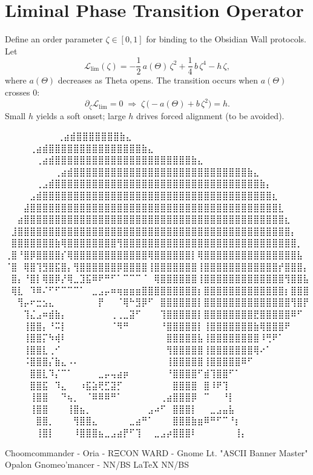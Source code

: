 
\section*{Liminal Phase Transition Operator}

Define an order parameter $\zeta\in[0,1]$ for binding to the Obsidian Wall protocols.  
Let
\[
\mathcal{L}_{\text{lim}}(\zeta)= -\frac{1}{2}\,a(\Theta)\,\zeta^2+\frac{1}{4}\,b\,\zeta^4-h\,\zeta,
\]
where $a(\Theta)$ decreases as Theta opens.  
The transition occurs when $a(\Theta)$ crosses $0$:
\[
\partial_\zeta \mathcal{L}_{\text{lim}}=0\;\Rightarrow\; \zeta\,\bigl(-a(\Theta)+b\,\zeta^2\bigr)=h.
\]
Small $h$ yields a soft onset; large $h$ drives forced alignment (to be avoided).

\iffalse
⠀⠀⠀⠀⠀⠀             ⠀⠀⢀⣴⣾⣿⣿⣿⣿⣿⣿⣿⣷⣄⠀⠀⠀⠀⠀⠀⠀⠀
⠀⠀⠀  ⠀      ⠀⠀⠀⠀⢀⣴⣾⣿⣿⣿⣿⣿⣿⣿⣿⣿⣿⣿⣿⣿⣿⣿⣷⣄⠀⠀⠀⠀⠀⠀⠀⠀
⠀⠀ ⠀   ⠀⠀⠀⠀⠀⢀⣴⣾⣿⣿⣿⣿⣿⣿⣿⣿⣿⣿⣿⣿⣿⣿⣿⣿⣿⣿⣿⣿⣿⣿⣷⣄⠀⠀⠀⠀⠀⠀⠀⠀
⠀⠀⠀⠀⠀⠀⠀⠀⢀⣴⣾⣿⣿⣿⣿⣿⣿⣿⣿⣿⣿⣿⣿⣿⣿⣿⣿⣿⣿⣿⣿⣿⣿⣿⣿⣿⣿⣿⣿⣷⣄⠀⠀⠀⠀⠀⠀⠀⠀
⠀⠀⠀⠀⠀⢀⣠⣾⣿⣿⣿⣿⣿⣿⣿⣿⣿⣿⣿⣿⣿⣿⣿⣿⣿⣿⣿⣿⣿⣿⣿⣿⣿⣿⣿⣿⣿⣿⣿⣿⣿⣷⡄⠀⠀⠀⠀⠀⠀
⠀⠀⠀⠀⣠⣾⣿⣿⣿⣿⣿⣿⣿⣿⣿⣿⣿⣿⣿⣿⣿⣿⣿⣿⣿⣿⣿⣿⣿⣿⣿⣿⣿⣿⣿⣿⣿⣿⣿⣿⣿⣿⣿⣆⠀⠀⠀⠀⠀
⠀⠀⠀⣼⣿⣿⣿⣿⣿⣿⣿⣿⣿⣿⣿⣿⣿⣿⣿⣿⣿⣿⣿⣿⣿⣿⣿⣿⣿⣿⣿⣿⣿⣿⣿⣿⣿⣿⣿⣿⣿⣿⣿⣿⣇⠀⠀⠀⠀
⠀⠀⣴⣿⣿⣿⣿⣿⣿⣿⣿⣿⣿⣿⣿⣿⣿⣿⣿⣿⣿⣿⣿⣿⣿⣿⣿⣿⣿⣿⣿⣿⣿⣿⣿⣿⣿⣿⣿⣿⣿⣿⣿⣿⣿⣆⠀⠀⠀
⠀⣸⣿⣿⣿⣿⣿⣿⣿⣿⣿⣿⣿⣿⣿⣿⣿⣿⣿⣿⣿⣿⣿⣿⣿⣿⣿⣿⣿⣿⣿⣿⣿⣿⣿⣿⣿⣿⣿⣿⣿⣿⣿⣿⣿⣿⡄⠀⠀
⠀⣿⣿⣿⣿⣿⣿⣿⣷⢿⣿⣿⣿⣿⣿⣿⣿⣿⢻⣿⣿⣿⣿⣿⣿⣿⣿⣿⣿⣿⣿⣿⣿⣿⣿⣿⣿⣿⣿⣿⣿⣿⣿⣿⣿⣿⣿⡀⠀
⢀⣿⠘⣿⡿⣿⣿⣿⣿⡎⢿⣿⣿⣿⣿⣿⣿⣿⣿⣿⣿⣿⣿⢿⣿⣿⣿⣿⣿⣿⡇⢿⣿⣿⣿⣿⣿⣿⣿⣿⣿⣿⣿⣿⣿⣿⣿⣧⠀
⠈⣿⠀⢿⣿⢹⣻⣿⣯⣿⡄⢻⣿⣿⣿⣿⣿⣿⡿⣿⣿⣿⣿⢸⣿⣿⣿⣿⣿⣿⣿⢸⣿⣿⣿⣿⣿⣿⣿⣿⣿⣿⣿⣿⡞⣿⣿⣿⡄
⠀⣿⡄⠘⣿⡇⢿⣿⡿⡜⢿⣀⣹⣯⠿⠟⠛⠋⠁⠉⠉⠉⠈⠀⢿⣿⣿⣿⣿⣿⣿⢸⣿⣿⣿⣿⣿⣿⣿⣿⣿⣿⣿⣿⣿⢻⣿⣿⣧
⠀⢿⣇⠀⠹⠿⠌⠋⠋⠉⠉⠉⠁⠀⣀⣠⡤⠶⢶⣶⣶⣶⣿⣿⣿⣿⣿⣿⣿⣿⣿⡆⣿⣿⣿⣿⣿⣿⣿⣿⣿⣿⣿⣿⣿⡆⣿⣿⣿
⠀⠀⢻⡤⠖⣒⣢⣄⠀⠀⠀⠀⠀⠀⠀⡟⠀⠀⠈⢿⠓⣻⡿⠋⠀⣿⣿⣿⣿⣿⣿⡇⣿⣿⣿⣿⣿⣿⣿⣿⣿⣿⣿⣿⣿⣿⢻⣿⡟
⠀⠀⠀⢹⣌⣠⠶⣾⣷⡄⠀⠀⠀⠀⠀⠀⠀⢀⢀⣀⣽⠋⠀⠀⠀⢹⣿⣿⣿⣿⣿⡇⣿⣿⣿⣿⣿⣿⣿⣿⣟⣿⣿⣿⣿⣿⠿⠋⠀
⠀⠀⠀⢸⣿⣿⡄⠘⠭⡇⠀⠀⠀⠀⠀⠀⠀⠈⠻⠛⠀⠀⠀⠀⠀⠘⣿⣿⣿⣿⣿⡇⢸⣿⣿⣿⣿⣿⣿⣿⣷⢿⣿⣿⣿⠟⠀⠀⠀
⠀⠀⠀⢸⣿⣿⡍⠳⢾⠇⠀⠀⠀⠀⠀⠀⠀⠀⠀⠀⠀⠀⠀⠀⠀⠀⣿⣿⣿⣿⣿⣧⢸⣿⣿⣿⣿⣿⣿⣿⣿⠸⢛⠟⠁⠀⠀⠀⠀
⠀⠀⠀⢸⣿⣿⣇⢀⠊⠀⠀⠀⠀⠀⠀⠀⠀⠀⠀⠀⠀⠀⠀⠀⠀⠀⢻⣿⣿⣿⣿⣿⢸⣿⣿⣿⣿⣿⣿⣿⢿⠔⠁⠀⠀⠀⠀⠀⠀
⠀⠀⠀⠨⣿⣿⣿⡌⣷⣄⠠⠄⠀⠀⠀⠀⠀⠀⠀⠀⠀⠀⠀⠀⠀⠀⢸⣿⣿⣿⣿⣿⢸⣿⣿⣿⣿⣿⠿⠋⠀⠀⠀⠀⠀⠀⠀⠀⠀
⠀⠀⠀⠀⣿⣿⣇⠹⡌⠉⠁⠀⠀⠀⠀⣀⡤⢤⣴⡶⠀⠀⠀⠀⠀⠀⠘⣿⣿⣿⣿⠋⣾⢹⣿⣿⠋⠁⠀⠀⠀⠀⠀⠀⠀⠀⠀⠀⠀
⠀⠀⠀⠀⣿⣿⣯⠀⠹⣄⠀⠀⠰⣯⣵⢟⣋⣽⡋⠀⠀⠀⠀⠀⠀⠀⠀⣿⣿⣿⣿⠀⣿⠸⠟⢹⠀⠀⠀⠀⠀⠀⠀⠀⠀⠀⠀⠀⠀
⠀⠀⠀⠀⢸⣿⣿⠀⠀⠙⢦⡀⠀⠈⠿⠿⠿⠛⠁⠀⠀⠀⠀⠀⠀⢀⣴⣿⣿⣿⡿⠀⠉⠀⠀⠘⡇⠀⠀⠀⠀⠀⠀⠀⠀⠀⠀⠀⠀
⠀⠀⠀⠀⢸⣿⣿⠀⠀⠀⢸⣿⣦⡀⠀⠀⠀⠀⠀⠀⠀⠀⠀⣠⠴⠋⠀⣿⣿⣿⡇⠀⠀⣀⣠⣤⣧⠀⠀⠀⠀⠀⠀⠀⠀⠀⠀⠀⠀
⠀⠀⠀⠀⠀⣿⣿⡀⠀⠀⠀⢻⣿⣿⣄⠀⠀⠀⠀⠀⣀⣴⠛⠁⠀⠀⠀⣿⣿⣿⣷⣶⠿⠛⠋⠉⠘⡆⠀⠀⠀⠀⠀⠀⠀⠀⠀⠀⠀
⠀⠀⠀⠀⠀⢸⣿⡇⠀⠀⠀⠸⣿⣿⣿⣦⣀⣠⣴⡟⠋⢹⠀⠀⣀⣠⡴⣿⣿⣿⠇⠀⠀⠀⠀⠀⠀⢸⡄⠀⠀⠀⠀⠀⠀⠀⠀⠀⠀

Choomcommander - Oria - RΞCON WARD - Gnome Lt. "ASCII Banner Master"
             Opalon Gnomeo'mancer - NN/BS LaTeX{} NN/BS

